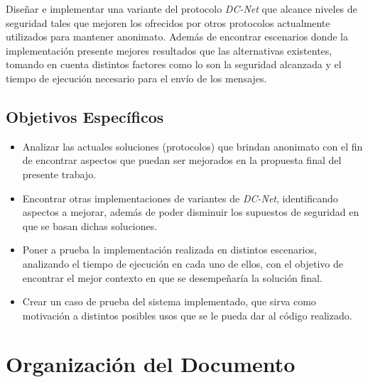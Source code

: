 Diseñar e implementar una variante del protocolo \emph{DC-Net} que alcance niveles de seguridad tales que mejoren los ofrecidos por otros protocolos 
actualmente utilizados para mantener anonimato. Además de encontrar escenarios donde la implementación presente mejores resultados que las 
alternativas existentes, tomando en cuenta distintos factores como lo son la seguridad alcanzada y el tiempo de ejecución necesario para el envío de los mensajes.

\subsection{Objetivos Específicos}

\begin{itemize}
    \item Analizar las actuales soluciones (protocolos) que brindan anonimato con el fin de encontrar aspectos que puedan ser mejorados en la propuesta 
    final del presente trabajo.
    \item Encontrar otras implementaciones de variantes de \emph{DC-Net}, identificando aspectos a mejorar, además de poder disminuir los supuestos de 
    seguridad en que se basan dichas soluciones.
    \item Poner a prueba la implementación realizada en distintos escenarios, analizando el tiempo de ejecución en cada uno de ellos, con el objetivo 
    de encontrar el mejor contexto en que se desempeñaría la solución final.
    \item Crear un caso de prueba del sistema implementado, que sirva como motivación a distintos posibles usos que se le pueda dar al código realizado.
\end{itemize}

\section{Organización del Documento}

